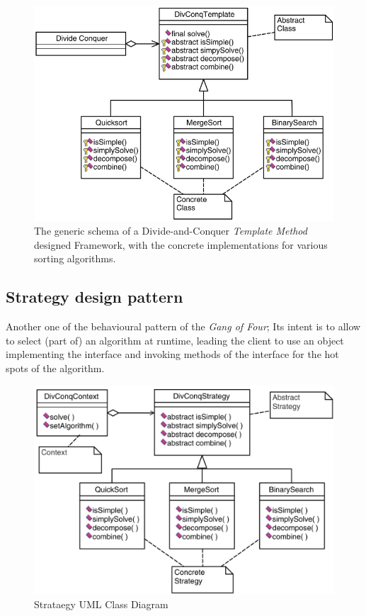 \begin{figure}[htbp]
   \centering
   \includegraphics{images/dp_templatemethod_divide.png} 
   \caption{The generic schema of a Divide-and-Conquer \textit{Template Method} designed Framework, with the concrete implementations for various sorting algorithms.}
   \label{fig:dp_templatemethod_code}
\end{figure}

\subsection{Strategy design pattern}
Another one of the behavioural pattern of the \textit{Gang of Four};
Its intent is to allow to select (part of) an algorithm at runtime, leading the client to use an object implementing the interface and
invoking methods of the interface for the hot spots of the
algorithm.

\begin{figure}[htbp]
   \centering
   \includegraphics{images/strategyUML.png}
   \caption{Strataegy UML Class Diagram}
   \label{fig:strategyUML}
\end{figure}
\newpage
